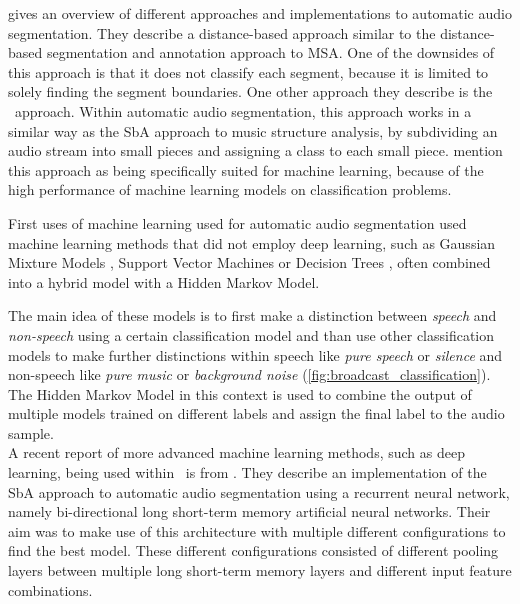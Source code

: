 \textcite{Theodorou2014overview} gives an overview of different approaches and implementations to automatic audio segmentation. They describe a distance-based approach similar to the distance-based segmentation and annotation approach to MSA. One of the downsides of this approach is that it does not classify each segment, because it is limited to solely finding the segment boundaries. One other approach they describe is the \sba\ approach. Within automatic audio segmentation, this approach works in a similar way as the SbA approach to music structure analysis, by subdividing an audio stream into small pieces and assigning a class to each small piece. \citeauthor{Theodorou2014overview} mention this approach as being specifically suited for machine learning, because of the high performance of machine learning models on classification problems.

First uses of machine learning used for automatic audio segmentation used machine learning methods that did not employ deep learning, such as Gaussian Mixture Models \cite{Misra2012speech,Kos2009line,Zhang2010audio,Butko2011audio,Dogan2009content}, Support Vector Machines \cite{Richard2007combined,Lu2001content,Zahid2015optimized,Dogan2009content,Patsis2008speech,Lo2010homogeneous} or Decision Trees \cite{Patsis2008speech,Butko2011audio}, often combined into a hybrid model with a Hidden Markov Model.

The main idea of these models is to first make a distinction between \textit{speech} and \textit{non-speech} using a certain classification model and than use other classification models to make further distinctions within speech like \textit{pure speech} or \textit{silence} and non-speech like \textit{pure music} or \textit{background noise} (\autoref{fig:broadcast_classification}). The Hidden Markov Model in this context is used to combine the output of multiple models trained on different labels and assign the final label to the audio sample.\\

 A recent report of more advanced machine learning methods, such as deep learning, being used within \aas\ is from \textcite{Gimeno2020a}. They describe an implementation of the SbA approach to automatic audio segmentation using a recurrent neural network, namely bi-directional long short-term memory artificial neural networks. Their aim was to make use of this architecture with multiple different configurations to find the best model. These different configurations consisted of different pooling layers between multiple long short-term memory layers and different input feature combinations.

